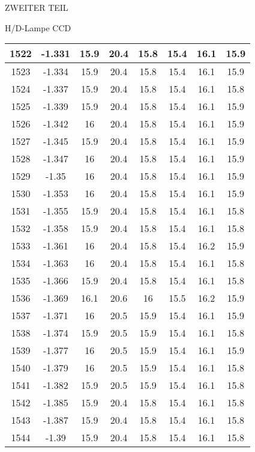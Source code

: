 \begin{appendix}
\begin{chapter}{ZWEITER TEIL}
\begin{section}{H/D-Lampe CCD}
\begin{scriptsize}
\begin{longtable}[htbp]{|c|c|c|c|c|c|c|c|}
            1522 & -1.331 & 15.9 & 20.4 & 15.8 & 15.4 & 16.1 & 15.9 \\ \hline
            1523 & -1.334 & 15.9 & 20.4 & 15.8 & 15.4 & 16.1 & 15.9 \\ \hline
            1524 & -1.337 & 15.9 & 20.4 & 15.8 & 15.4 & 16.1 & 15.8 \\ \hline
            1525 & -1.339 & 15.9 & 20.4 & 15.8 & 15.4 & 16.1 & 15.9 \\ \hline
            1526 & -1.342 & 16 & 20.4 & 15.8 & 15.4 & 16.1 & 15.9 \\ \hline
            1527 & -1.345 & 15.9 & 20.4 & 15.8 & 15.4 & 16.1 & 15.9 \\ \hline
            1528 & -1.347 & 16 & 20.4 & 15.8 & 15.4 & 16.1 & 15.9 \\ \hline
            1529 & -1.35 & 16 & 20.4 & 15.8 & 15.4 & 16.1 & 15.9 \\ \hline
            1530 & -1.353 & 16 & 20.4 & 15.8 & 15.4 & 16.1 & 15.9 \\ \hline
            1531 & -1.355 & 15.9 & 20.4 & 15.8 & 15.4 & 16.1 & 15.8 \\ \hline
            1532 & -1.358 & 15.9 & 20.4 & 15.8 & 15.4 & 16.1 & 15.8 \\ \hline
            1533 & -1.361 & 16 & 20.4 & 15.8 & 15.4 & 16.2 & 15.9 \\ \hline
            1534 & -1.363 & 16 & 20.4 & 15.8 & 15.4 & 16.1 & 15.8 \\ \hline
            1535 & -1.366 & 15.9 & 20.4 & 15.8 & 15.4 & 16.1 & 15.8 \\ \hline
            1536 & -1.369 & 16.1 & 20.6 & 16 & 15.5 & 16.2 & 15.9 \\ \hline
            1537 & -1.371 & 16 & 20.5 & 15.9 & 15.4 & 16.1 & 15.9 \\ \hline
            1538 & -1.374 & 15.9 & 20.5 & 15.9 & 15.4 & 16.1 & 15.8 \\ \hline
            1539 & -1.377 & 16 & 20.5 & 15.9 & 15.4 & 16.1 & 15.9 \\ \hline
            1540 & -1.379 & 16 & 20.5 & 15.9 & 15.4 & 16.1 & 15.8 \\ \hline
            1541 & -1.382 & 15.9 & 20.5 & 15.9 & 15.4 & 16.1 & 15.8 \\ \hline
            1542 & -1.385 & 15.9 & 20.4 & 15.8 & 15.4 & 16.1 & 15.8 \\ \hline
            1543 & -1.387 & 15.9 & 20.4 & 15.8 & 15.4 & 16.1 & 15.8 \\ \hline
            1544 & -1.39 & 15.9 & 20.4 & 15.8 & 15.4 & 16.1 & 15.8 \\ \hline

\end{longtable}
\end{scriptsize}
\end{section}
\end{chapter}
\end{appendix}
